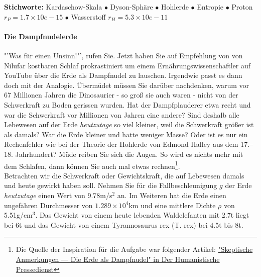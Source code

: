 \documentclass[a4paper, 9pt]{scrartcl}\usepackage[]{graphicx}\usepackage[]{xcolor}
\begin{document}
{\tiny\textbf{Stichworte:} Kardaschow-Skala $\bullet$ Dyson-Sphäre $\bullet$ Hohlerde $\bullet$ Entropie $\bullet$ Proton $r_P = 1.7 \times 10e-15$ $\bullet$ Wasserstoff $r_H = 5.3\times 10e-11$}

\ifcollection
\paragraph{Die Dampfnudelerde}
\fi



"'Was für einen Unsinn!"', rufen Sie. Jetzt haben Sie auf Empfehlung von von Nilufar kostbaren Schlaf prokrastiniert um einem Ernährungswissenschaftler auf YouTube über die Erde als Dampfnudel zu lauschen. Irgendwie passt es dann doch mit der Analogie. Übermüdet müssen Sie darüber nachdenken, warum vor 67 Millionen Jahren die Dinosaurier - so groß sie auch waren - nicht von der Schwerkraft zu Boden gerissen wurden. Hat der Dampfplauderer etwa recht und war die Schwerkraft vor Millionen von Jahren eine andere?  Sind deshalb alle Lebewesen auf der Erde \textit{heutzutage} so viel kleiner, weil die Schwerkraft größer ist als damals? War die Erde kleiner und hatte weniger Masse? Oder ist es nur ein Rechenfehler wie bei der Theorie der Hohlerde von Edmond Halley aus dem 17.–18. Jahrhundert? Müde reiben Sie sich die Augen. So wird es nichts mehr mit dem Schlafen, dann können Sie auch mal etwas rechnen\footnote{Die Quelle der Inspiration
  für die Aufgabe war folgender Artikel:
  \href{https://hpd.de/artikel/erde-dampfnudel-22236}{"Skeptische Anmerkungen --- Die Erde als Dampfnudel" in Der Humanistische Pressedienst}}.  \\

Betrachten wir die Schwerkraft oder Gewichtskraft, die auf Lebewesen damals und heute gewirkt haben soll. Nehmen Sie für die Fallbeschleunigung $g$ der Erde \textit{heutzutage} einen Wert von 9.78m/s$^2$ an. Im Weiteren hat die Erde einen ungefähren Durchmesser von \ensuremath{1.289\times 10^{4}}km und eine mittlere Dichte $\rho$ von 5.51g/cm$^3$. Das Gewicht von einem heute lebenden Waldelefanten mit 2.7t liegt bei 6t und das Gewicht von einem Tyrannosaurus rex (T. rex) bei 4.5t bis 8t.
\end{document}
